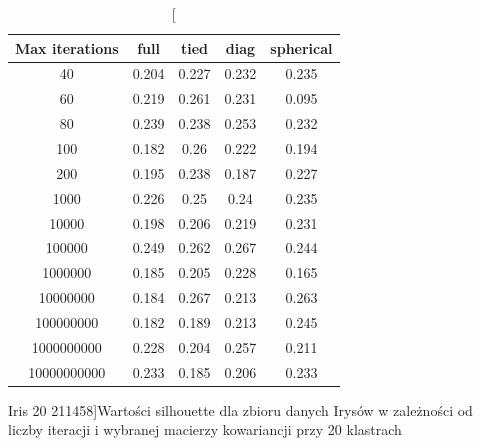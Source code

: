 \documentclass{classrep}
\begin{document}
{{\begin{table}[!htbp]
                \begin{minipage}{1\textwidth}
                \centering
                \begin{tabular}{|c|c|c|c|c|}
                \hline
                Max iterations & full & tied & diag & spherical \\ \hline
                40 & 0.204 & 0.227 & 0.232 & 0.235 \\ \hline
                60 & 0.219 & 0.261 & 0.231 & 0.095 \\ \hline
                80 & 0.239 & 0.238 & 0.253 & 0.232 \\ \hline
                100 & 0.182 & 0.26 & 0.222 & 0.194 \\ \hline
                200 & 0.195 & 0.238 & 0.187 & 0.227 \\ \hline
                1000 & 0.226 & 0.25 & 0.24 & 0.235 \\ \hline
                10000 & 0.198 & 0.206 & 0.219 & 0.231 \\ \hline
                100000 & 0.249 & 0.262 & 0.267 & 0.244 \\ \hline
                1000000 & 0.185 & 0.205 & 0.228 & 0.165 \\ \hline
                10000000 & 0.184 & 0.267 & 0.213 & 0.263 \\ \hline
                100000000 & 0.182 & 0.189 & 0.213 & 0.245 \\ \hline
                1000000000 & 0.228 & 0.204 & 0.257 & 0.211 \\ \hline
                10000000000 & 0.233 & 0.185 & 0.206 & 0.233 \\ \hline
                \end{tabular}
                \caption
                [Iris 20 211458]{Wartości silhouette dla zbioru danych Irysów w zależności od liczby iteracji i wybranej macierzy kowariancji przy 20 klastrach}
                \label{Iris_20_211458}
                \end{minipage}
                \hfill
            \end{table}
            
}}
\end{document}
